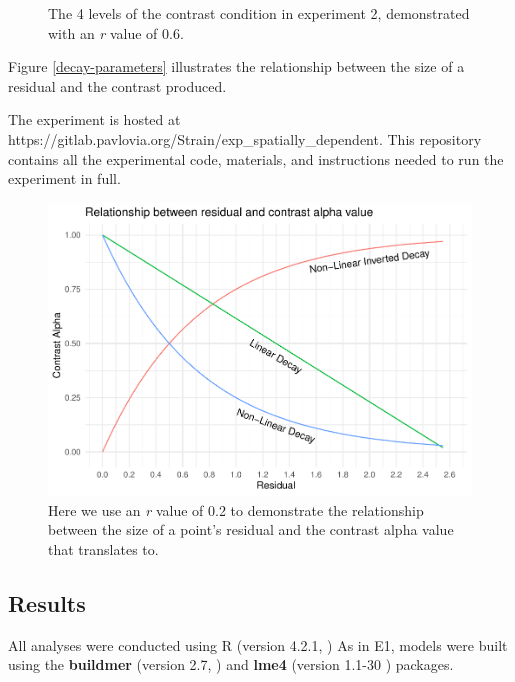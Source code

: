 \documentclass[preprint, 3p,
authoryear]{elsarticle} %
\begin{document}
\begin{figure}
\caption{\label{e2-example-plots}The 4 levels of the contrast condition in experiment 2, demonstrated with an \textit{r} value of 0.6.}\label{fig:e2-example-plots}
\end{figure}

Figure \ref{decay-parameters} illustrates the relationship between the
size of a residual and the contrast produced.

The experiment is hosted at
https://gitlab.pavlovia.org/Strain/exp\_spatially\_dependent. This
repository contains all the experimental code, materials, and
instructions needed to run the experiment in full.

\begin{figure}
\includegraphics[width=1\linewidth]{contrast_and_scatterplots_files/figure-latex/decay-parameters-1} \caption{\label{decay-parameters}Here we use an \textit{r} value of 0.2 to demonstrate the relationship between the size of a point's residual and the contrast alpha value that translates to.}\label{fig:decay-parameters}
\end{figure}

\hypertarget{results-1}{%
\subsection{Results}\label{results-1}}

All analyses were conducted using R (version 4.2.1, \citep{r_core}) As
in E1, models were built using the \textbf{buildmer} (version 2.7,
\citep{voeten_buildmer_2022}) and \textbf{lme4} (version 1.1-30
\citep{bates_lme4_2015}) packages.
\end{document}
